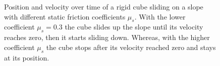 \begin{figure}[h!]
	\begin{minipage}[b]{0.5 \linewidth}
		\centering
	\end{minipage}
	\begin{minipage}[b]{0.5 \linewidth}
		\centering
	\end{minipage}	
\caption[Position and velocity over time of a rigid cube sliding on a slope with different static friction coefficients $\mu_s$.]{Position and velocity over time of a rigid cube sliding on a slope with different static friction coefficients $\mu_s$. With the lower coefficient $\mu_s=0.3$ the cube slides up the slope until its velocity reaches zero, then it starts sliding down. Whereas, with the higher coefficient $\mu_s$ the cube stops after its velocity reached zero and stays at its position.}
\label{fig::friction_dynstat}
\end{figure}

